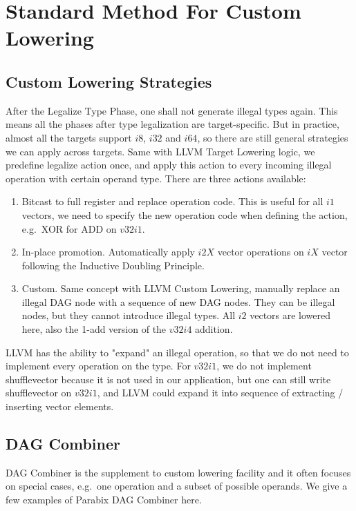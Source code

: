 \section{Standard Method For Custom Lowering}
\subsection{Custom Lowering Strategies}
After the Legalize Type Phase, one shall not generate illegal types again. This means all the phases after type legalization are target-specific. But in practice, almost all the targets support $i8$, $i32$ and $i64$, so there are still general strategies we can apply across targets. Same with LLVM Target Lowering logic, we predefine legalize action once, and apply this action to every incoming illegal operation with certain operand type. There are three actions available:

\begin{enumerate}
    \item Bitcast to full register and replace operation code. This is useful for all $i1$ vectors, we need to specify the new operation code when defining the action, e.g.\ XOR for ADD on $v32i1$.
    \item In-place promotion. Automatically apply $i2X$ vector operations on $iX$ vector following the Inductive Doubling Principle.
    \item Custom. Same concept with LLVM Custom Lowering, manually replace an illegal DAG node with a sequence of new DAG nodes. They can be illegal nodes, but they cannot introduce illegal types. All $i2$ vectors are lowered here, also the 1-add version of the $v32i4$ addition.
\end{enumerate}

LLVM has the ability to "expand" an illegal operation, so that we do not need to implement every operation on the type. For $v32i1$, we do not implement shufflevector because it is not used in our application, but one can still write shufflevector on $v32i1$, and LLVM could expand it into sequence of extracting / inserting vector elements.

\subsection{DAG Combiner}
DAG Combiner is the supplement to custom lowering facility and it often focuses on special cases, e.g.\ one operation and a subset of possible operands. We give a few examples of Parabix DAG Combiner here.

